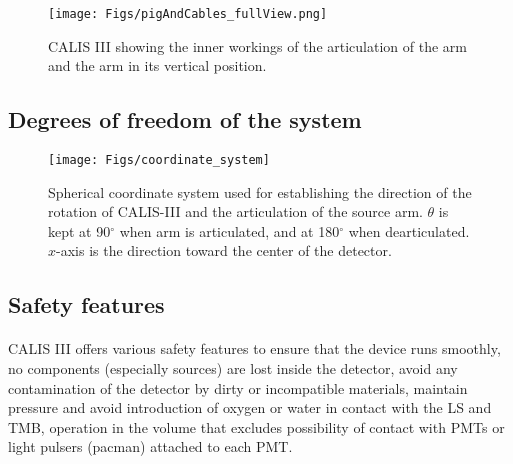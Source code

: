 \begin{figure}[htbp]
 \centering
  \texttt{[image: Figs/pigAndCables\_fullView.png]}
  \caption{CALIS III showing the inner workings of the articulation of the arm and the arm in its vertical position. }
  \label{fig:pigAndCables_fullView}
\end{figure}


\subsection{Degrees of freedom of the system}
\begin{figure}[htbp]
 \centering
  \texttt{[image: Figs/coordinate\_system]}
  \caption{Spherical coordinate system used for establishing the direction of the rotation of CALIS-III and the articulation of the source arm. $\theta$ is kept at 90$^{\circ}$ when arm is articulated, and at 180$^{\circ}$ when dearticulated. $x$-axis is the direction toward the center of the detector. }
  \label{fig:coordinate_system}
\end{figure} 
	
 \subsection{Safety features} \label{Safety Features}
  \paragraph{} 
 CALIS III offers various safety features to ensure that the device runs smoothly, no components (especially sources) are lost inside the detector, avoid any contamination of the detector by dirty or incompatible materials, maintain pressure and avoid introduction of oxygen or water in contact with the LS and TMB, operation in the volume that excludes possibility of contact with PMTs or light pulsers (pacman) attached to each PMT.
 
